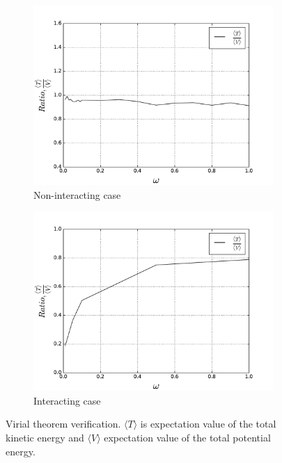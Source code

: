 \documentclass[10pt]{article}
\begin{document}
\begin{figure}[h!] 
  \begin{subfigure}[b]{0.55\linewidth}
    \centering
    \includegraphics[width=0.9\linewidth]{Ratio_non_ineracting} 
    \caption{Non-interacting case} 
    \label{fig2:a} 
    \vspace{1ex}
  \end{subfigure}%
  \begin{subfigure}[b]{0.55\linewidth}
    \centering
    \includegraphics[width=0.9\linewidth]{ratio_on_omega_ineraction} 
    \caption{Interacting case} 
    \label{fig2:b} 
    \vspace{1ex}
  \end{subfigure} 
  \caption{Virial theorem verification. $\langle T \rangle$ is expectation value of the total kinetic energy and   $\langle V \rangle$ expectation value of the total potential energy.} 
  \label{fig2} 
\end{figure}
\end{document}
